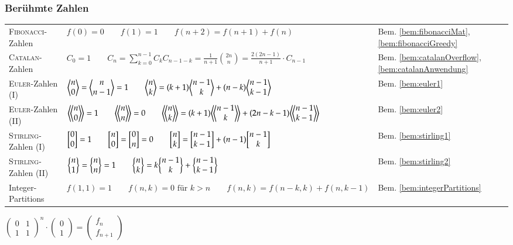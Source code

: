 \subsubsection{Berühmte Zahlen}
\begin{tabularx}{\textwidth}{|l|X|l|}
	\hline
	\textsc{Fibonacci}-Zahlen	&
	$f(0) = 0 \qquad
	f(1) = 1 \qquad
	f(n+2) = f(n+1) + f(n)$ &
	Bem. \ref{bem:fibonacciMat}, \ref{bem:fibonacciGreedy} \\

	\textsc{Catalan}-Zahlen	&
	$C_0 = 1 \qquad
	C_n = \sum\limits_{k = 0}^{n - 1} C_kC_{n - 1 - k} =
	\frac{1}{n + 1}\binom{2n}{n} = \frac{2(2n - 1)}{n+1} \cdot C_{n-1}$ &
	Bem. \ref{bem:catalanOverflow}, \ref{bem:catalanAnwendung} \\

	\textsc{Euler}-Zahlen (I) &
	$\biggl\langle \begin{matrix} n \\ 0 \end{matrix} \biggr\rangle = \biggl\langle \begin{matrix} n \\ n-1 \end{matrix} \biggr\rangle = 1 \qquad
	\biggl\langle \begin{matrix} n \\ k \end{matrix} \biggr\rangle = (k+1) \biggl\langle \begin{matrix} n-1 \\ k \end{matrix} \biggr\rangle + (n-k) \biggl\langle \begin{matrix} n-1 \\ k-1 \end{matrix} \biggr\rangle $ &
	Bem. \ref{bem:euler1} \\

	\textsc{Euler}-Zahlen (II) &
	$\eulerII{n}{0} = 1 \qquad
	\eulerII{n}{n} = 0 \qquad
	\eulerII{n}{k} = (k+1) \eulerII{n-1}{k} + (2n-k-1) \eulerII{n-1}{k-1}$ &
	Bem. \ref{bem:euler2} \\

	\textsc{Stirling}-Zahlen (I) &
	$\biggl[ \begin{matrix} 0 \\ 0 \end{matrix} \biggr] = 1 \qquad
	\biggl[ \begin{matrix} n \\ 0 \end{matrix} \biggr] = \biggl[ \begin{matrix} 0 \\ n \end{matrix} \biggr] = 0 \qquad
	\biggl[ \begin{matrix} n \\ k \end{matrix} \biggr] = \biggl[ \begin{matrix} n-1 \\ k-1 \end{matrix} \biggr] + (n-1) \biggl[ \begin{matrix} n-1 \\ k \end{matrix} \biggr]$ &
	Bem. \ref{bem:stirling1} \\

	\textsc{Stirling}-Zahlen (II) &
	$\biggl\{ \begin{matrix} n \\ 1 \end{matrix} \biggr\} = \biggl\{ \begin{matrix} n \\ n \end{matrix} \biggr\} = 1 \qquad
	\biggl\{ \begin{matrix} n \\ k \end{matrix} \biggr\} = k \biggl\{ \begin{matrix} n-1 \\ k \end{matrix} \biggr\} + \biggl\{ \begin{matrix} n-1 \\ k-1 \end{matrix} \biggr\}$ &
	Bem. \ref{bem:stirling2} \\

	Integer-Partitions &
	$f(1,1) = 1 \qquad f(n,k) = 0 \text{ für } k > n \qquad f(n,k)  =
	f(n-k,k) + f(n,k-1)$ &
	Bem. \ref{bem:integerPartitions} \\
	\hline
\end{tabularx}

\begin{bem}\label{bem:fibonacciMat}
	$
	\begin{pmatrix} 0 & 1 \\ 1 & 1 \end{pmatrix}^n
	\cdot
	\begin{pmatrix} 0 \\ 1 \end{pmatrix}
	=
	\begin{pmatrix}f_n \\ f_{n+1} \end{pmatrix}
	$
\end{bem}

